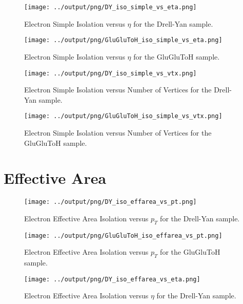 \documentclass[11pt]{book}
\begin{document}
\begin{figure}[htb]
\centering
\texttt{[image: ../output/png/DY\_iso\_simple\_vs\_eta.png]}
\caption{Electron Simple Isolation versus $\eta$ for the Drell-Yan sample.}
\label{fig:dy_iso_simple_vs_eta}
\end{figure}

\begin{figure}[htb]
\centering
\texttt{[image: ../output/png/GluGluToH\_iso\_simple\_vs\_eta.png]}
\caption{Electron Simple Isolation versus $\eta$ for the GluGluToH sample.}
\label{fig:ggh_iso_simple_vs_eta}
\end{figure}

\begin{figure}[htb]
\centering
\texttt{[image: ../output/png/DY\_iso\_simple\_vs\_vtx.png]}
\caption{Electron Simple Isolation versus Number of Vertices for the Drell-Yan sample.}
\label{fig:dy_iso_simple_vs_vtx}
\end{figure}

\begin{figure}[htb]
\centering
\texttt{[image: ../output/png/GluGluToH\_iso\_simple\_vs\_vtx.png]}
\caption{Electron Simple Isolation versus Number of Vertices for the GluGluToH sample.}
\label{fig:ggh_iso_simple_vs_vtx}
\end{figure}
\clearpage

\section{Effective Area}

\begin{figure}[htb]
\centering
\texttt{[image: ../output/png/DY\_iso\_effarea\_vs\_pt.png]}
\caption{Electron Effective Area Isolation versus $p_{T}$ for the Drell-Yan sample.}
\label{fig:dy_iso_effarea_vs_pt}
\end{figure}

\begin{figure}[htb]
\centering
\texttt{[image: ../output/png/GluGluToH\_iso\_effarea\_vs\_pt.png]}
\caption{Electron Effective Area Isolation versus $p_{T}$ for the GluGluToH sample.}
\label{fig:ggh_iso_effarea_vs_pt}
\end{figure}

\begin{figure}[htb]
\centering
\texttt{[image: ../output/png/DY\_iso\_effarea\_vs\_eta.png]}
\caption{Electron Effective Area Isolation versus $\eta$ for the Drell-Yan sample.}
\label{fig:dy_iso_effarea_vs_eta}
\end{figure}
\end{document}
